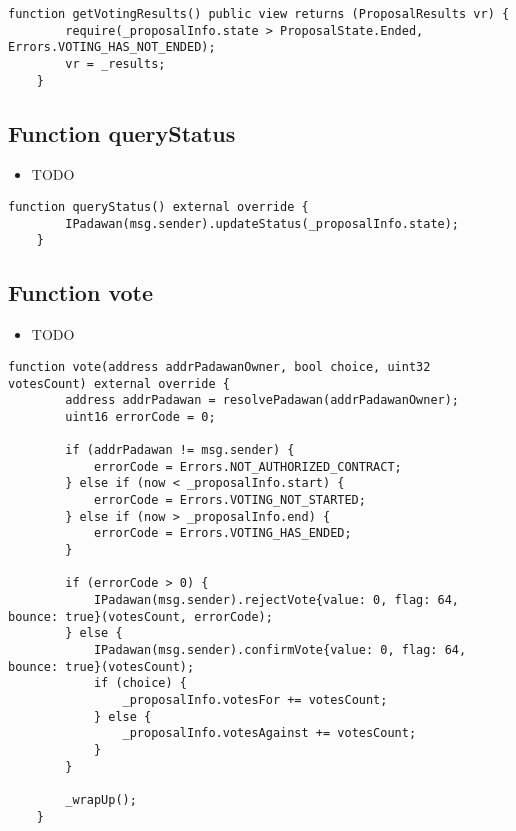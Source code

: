 \begin{lstlisting}[firstnumber=172]
    function getVotingResults() public view returns (ProposalResults vr) {
        require(_proposalInfo.state > ProposalState.Ended, Errors.VOTING_HAS_NOT_ENDED);
        vr = _results;
    }
\end{lstlisting}

\subsection{Function queryStatus}

\begin{itemize}
\item TODO
\end{itemize}

\begin{lstlisting}[firstnumber=162]
    function queryStatus() external override {
        IPadawan(msg.sender).updateStatus(_proposalInfo.state);
    }
\end{lstlisting}

\subsection{Function vote}

\begin{itemize}
\item TODO
\end{itemize}

\begin{lstlisting}[firstnumber=55]
    function vote(address addrPadawanOwner, bool choice, uint32 votesCount) external override {
        address addrPadawan = resolvePadawan(addrPadawanOwner);
        uint16 errorCode = 0;

        if (addrPadawan != msg.sender) {
            errorCode = Errors.NOT_AUTHORIZED_CONTRACT;
        } else if (now < _proposalInfo.start) {
            errorCode = Errors.VOTING_NOT_STARTED;
        } else if (now > _proposalInfo.end) {
            errorCode = Errors.VOTING_HAS_ENDED;
        }

        if (errorCode > 0) {
            IPadawan(msg.sender).rejectVote{value: 0, flag: 64, bounce: true}(votesCount, errorCode);
        } else {
            IPadawan(msg.sender).confirmVote{value: 0, flag: 64, bounce: true}(votesCount);
            if (choice) {
                _proposalInfo.votesFor += votesCount;
            } else {
                _proposalInfo.votesAgainst += votesCount;
            }
        }

        _wrapUp();
    }
\end{lstlisting}

